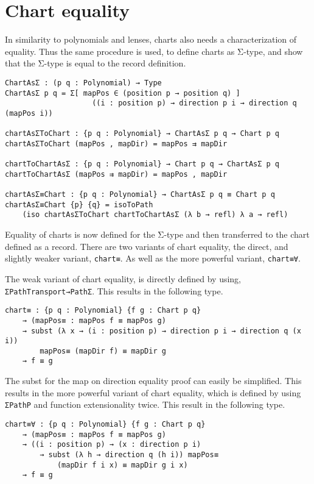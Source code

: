 \section{Chart equality}
In similarity to polynomials and lenses, charts also needs a characterization of equality. Thus the same procedure is used, to define charts as Σ-type, and show that the Σ-type is equal to the record definition.

\begin{verbatim}
ChartAsΣ : (p q : Polynomial) → Type
ChartAsΣ p q = Σ[ mapPos ∈ (position p → position q) ]
                    ((i : position p) → direction p i → direction q (mapPos i))

chartAsΣToChart : {p q : Polynomial} → ChartAsΣ p q → Chart p q
chartAsΣToChart (mapPos , mapDir) = mapPos ⇉ mapDir

chartToChartAsΣ : {p q : Polynomial} → Chart p q → ChartAsΣ p q
chartToChartAsΣ (mapPos ⇉ mapDir) = mapPos , mapDir

chartAsΣ≡Chart : {p q : Polynomial} → ChartAsΣ p q ≡ Chart p q
chartAsΣ≡Chart {p} {q} = isoToPath 
    (iso chartAsΣToChart chartToChartAsΣ (λ b → refl) λ a → refl)
\end{verbatim}

Equality of charts is now defined for the Σ-type and then transferred to the chart defined as a record. There are two variants of chart equality, the direct, and slightly weaker variant, \texttt{chart≡}. As well as the more powerful variant, \texttt{chart≡∀}.

The weak variant of chart equality, is directly defined by using, \texttt{ΣPathTransport→PathΣ}. This results in the following type.

\begin{verbatim}
chart≡ : {p q : Polynomial} {f g : Chart p q}
    → (mapPos≡ : mapPos f ≡ mapPos g)
    → subst (λ x → (i : position p) → direction p i → direction q (x i))
        mapPos≡ (mapDir f) ≡ mapDir g
    → f ≡ g
\end{verbatim}

The subst for the map on direction equality proof can easily be simplified. This results in the more powerful variant of chart equality, which is defined by using \texttt{ΣPathP} and function extensionality twice. This result in the following type.
\begin{verbatim}
chart≡∀ : {p q : Polynomial} {f g : Chart p q}
    → (mapPos≡ : mapPos f ≡ mapPos g)
    → ((i : position p) → (x : direction p i) 
        → subst (λ h → direction q (h i)) mapPos≡ 
            (mapDir f i x) ≡ mapDir g i x)
    → f ≡ g
\end{verbatim}


